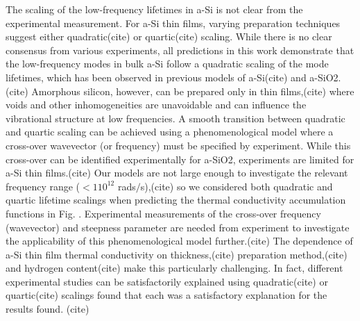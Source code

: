 \documentclass[aps,prb,twocolumn,superscriptaddress,footinbib,amsmath,amssymb,floatfix]{revtex4}
\begin{document}
The scaling of the low-frequency lifetimes 
in a-Si is not clear from the experimental measurement. 
For a-Si thin films, varying preparation techniques suggest either 
quadratic(cite) or quartic(cite) scaling. 
While there is no clear consensus from various experiments, all predictions in this 
work demonstrate that  
the low-frequency modes in bulk a-Si follow a quadratic scaling 
of the mode lifetimes, which has been observed in previous models of 
a-Si(cite) and 
a-SiO2.(cite)
Amorphous silicon, however, can be
prepared only in thin films,(cite) where voids and other 
inhomogeneities are unavoidable\cite{li_effect_2011} and can influence the 
vibrational structure at low frequencies.
\cite{feldman_tight-binding_2004,liu_high_2009} 
A smooth transition between quadratic and quartic scaling can be 
achieved using a phenomenological model where a cross-over wavevector 
(or frequency) must be specified by experiment.
\cite{baldi_elastic_2011} While this cross-over can be identified 
experimentally for a-SiO2,\cite{masciovecchio_evidence_2006} 
experiments are limited for a-Si thin films.(cite) Our models 
are not large enough to investigate the relevant frequency range 
($< 1 10^{12}$ rads$/$s),(cite) so we considered both 
quadratic and quartic lifetime scalings when predicting 
the thermal conductivity accumulation functions in Fig. . 
Experimental measurements of the cross-over frequency (wavevector) and 
steepness parameter are needed from experiment to investigate the 
applicability of this phenomenological model further.(cite) 
The dependence 
of a-Si thin film thermal conductivity on thickness,(cite) 
preparation method,(cite) 
and hydrogen content(cite) make this particularly challenging. In fact, 
different experimental studies can be satisfactorily explained using 
quadratic(cite) or quartic(cite) scalings 
found that each was a satisfactory explanation for the results found.
(cite) 
\end{document}
